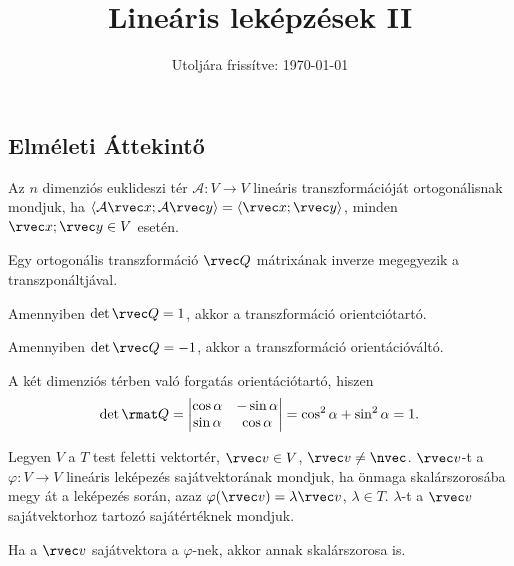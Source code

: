 \documentclass[a4paper, 12pt]{scrartcl}
\title{Lineáris leképzések II}
\date{Utoljára frissítve: \today}
\begin{document}
\maketitle
\subsection{Elméleti Áttekintő}

\begin{definition}
  Az $n$ dimenziós  euklideszi tér $\mathcal A: V \rightarrow V$ lineáris
  transzformációját ortogonálisnak mondjuk, ha $\langle \mathcal A \rvec x;
    \mathcal A \rvec y \rangle = \langle \rvec x; \rvec y \rangle$, minden $\rvec
    x; \rvec y \in V$ esetén.
\end{definition}

\begin{note}
  Egy ortogonális transzformáció $\rvec Q$ mátrixának inverze megegyezik a
  transzponáltjával.

  Amennyiben $\det \rvec Q = 1$, akkor a transzformáció orientciótartó.

  Amennyiben $\det \rvec Q = -1$, akkor a transzformáció orientációváltó.
\end{note}

\begin{example}
  A két dimenziós térben való forgatás orientációtartó, hiszen
  $$
    \det \rmat Q
    = \begin{vmatrix}
      \cos \alpha & -\sin \alpha \\
      \sin \alpha & \cos \alpha
    \end{vmatrix}
    = \cos^2 \alpha + \sin^2 \alpha
    = 1
    \text.
  $$
\end{example}

\begin{definition}
  Legyen $V$ a $T$ test feletti vektortér, $\rvec v \in V$, $\rvec v \neq
    \nvec$. $\rvec v$-t a $\varphi: V \rightarrow V$ lineáris leképezés
  sajátvektorának mondjuk, ha önmaga skalárszorosába megy át a leképezés
  során, azaz $\varphi(\rvec v) = \lambda \rvec v$,  $\lambda \in T$.
  $\lambda$-t a $\rvec v$ sajátvektorhoz tartozó sajátértéknek mondjuk.
\end{definition}

\begin{note}
  Ha a $\rvec v$ sajátvektora a $\varphi$-nek, akkor annak skalárszorosa is.
\end{note}
\end{document}
